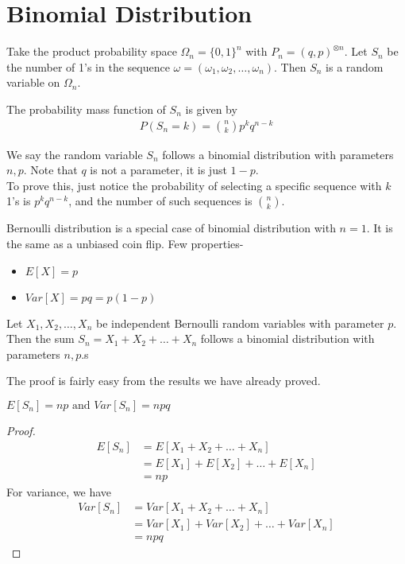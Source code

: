 \section{Binomial Distribution}
Take the product probability space $\Omega_n=\{0,1\}^n$ with $P_n=(q,p)^{\otimes n}$. Let $S_n$ be the number of 1's in the sequence $\omega=(\omega_1,\omega_2,\ldots,\omega_n)$. Then $S_n$ is a random variable on $\Omega_n$. 
\begin{theorem}
    The probability mass function of $S_n$ is given by
    \begin{align}
        P(S_n=k)=\binom{n}{k}p^kq^{n-k}
    \end{align}
\end{theorem}
We say the random variable $S_n$ follows a binomial distribution with parameters $n,p$. Note that $q$ is not a parameter, it is just $1-p$. 
\\To prove this, just notice the probability of selecting a specific sequence with $k$ 1's is $p^kq^{n-k}$, and the number of such sequences is $\binom{n}{k}$.
\begin{definition}
    Bernoulli distribution is a special case of binomial distribution with $n=1$. It is the same as a unbiased coin flip. Few properties-
    \begin{itemize}
        \item $E[X]=p$
        \item $Var[X]=pq=p(1-p)$
    \end{itemize}
\end{definition}
\begin{theorem}
    Let $X_1,X_2,\ldots,X_n$ be independent Bernoulli random variables with parameter $p$. Then the sum $S_n=X_1+X_2+\ldots+X_n$ follows a binomial distribution with parameters $n,p$.s
\end{theorem}
The proof is fairly easy from the results we have already proved.
\begin{theorem}
    $E[S_n]=np \text{ and } Var[S_n]=npq$
\end{theorem}
\begin{proof}
    \begin{align*}
        E[S_n]&=E[X_1+X_2+\ldots+X_n] \\
        &=E[X_1]+E[X_2]+\ldots+E[X_n] \\
        &=np
    \end{align*}
    For variance, we have 
    \begin{align*}
        Var[S_n]&=Var[X_1+X_2+\ldots+X_n] \\
        &=Var[X_1]+Var[X_2]+\ldots+Var[X_n] \\
        &=npq
    \end{align*}
\end{proof}

